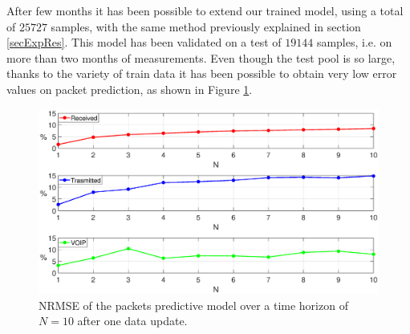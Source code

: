 After few months it has been possible to extend our trained model, using a total of $25727$ samples, with the same method previously explained in section \ref{secExpRes}. This model has been validated on a test of $19144$ samples, i.e. on more than two months of measurements. Even though the test pool is so large, thanks to the variety of train data it has been possible to obtain very low error values on packet prediction, as shown in Figure \ref{fig:{LONGTEST_Pescara}}.

\begin{figure}[h!]
	\centering
	\includegraphics[trim={120 0 120 0}, width=1\linewidth]{figure/LONGTEST_PESCARA.eps}
	\caption{NRMSE of the packets predictive model over a time horizon of $N=10$ after one data update.}
	\label{fig:{LONGTEST_Pescara}}
\end{figure}